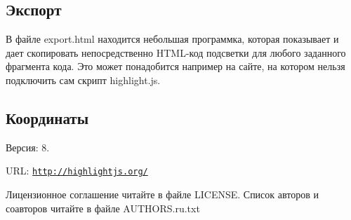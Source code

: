 \subsection*{Экспорт}

В файле export.\+html находится небольшая программка, которая показывает и дает скопировать непосредственно H\+T\+M\+L-\/код подсветки для любого заданного фрагмента кода. Это может понадобится например на сайте, на котором нельзя подключить сам скрипт highlight.\+js.

\subsection*{Координаты}


\begin{DoxyItemize}
\item Версия\+: 8.
\item U\+RL\+: \href{http://highlightjs.org/}{\tt http\+://highlightjs.\+org/}
\end{DoxyItemize}

Лицензионное соглашение читайте в файле L\+I\+C\+E\+N\+SE. Список авторов и соавторов читайте в файле A\+U\+T\+H\+O\+R\+S.\+ru.\+txt 